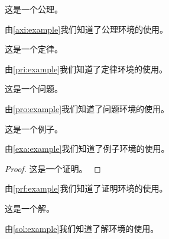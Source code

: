 \documentclass[withoutpreface,bwprint]{cumcmthesis}
\begin{document}
\begin{axiom}
    这是一个公理。
    \label{axi:example}
\end{axiom}
由\cref{axi:example}我们知道了公理环境的使用。

\begin{principle}
    这是一个定律。
    \label{pri:example}
\end{principle}
由\cref{pri:example}我们知道了定律环境的使用。

\begin{problem}
这是一个问题。
\label{pro:example}
\end{problem}
由\cref{pro:example}我们知道了问题环境的使用。

\begin{example}
    这是一个例子。
    \label{exa:example}
\end{example}
由\cref{exa:example}我们知道了例子环境的使用。

\begin{proof}
    这是一个证明。
    \label{prf:example}
\end{proof}
由\cref{prf:example}我们知道了证明环境的使用。

\begin{solution}
    这是一个解。
    \label{sol:example}
\end{solution}
由\cref{sol:example}我们知道了解环境的使用。
\end{document}

